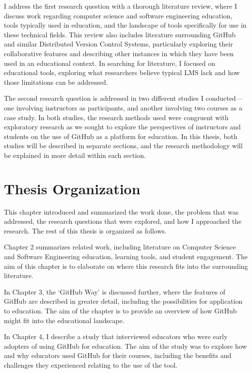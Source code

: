 I address the first research question with a thorough literature review, where I discuss work regarding computer science and software engineering education, tools typically used in education, and the landscape of tools specifically for use in these technical fields. This review also includes literature surrounding GitHub and similar Distributed Version Control Systems, particularly exploring their collaborative features and describing other instances in which they have been used in an educational context. In searching for literature, I focused on educational tools, exploring what researchers believe typical LMS lack and how those limitations can be addressed.

The second research question is addressed in two different studies I conducted---one involving instructors as participants, and another involving two courses as a case study. In both studies, the research methods used were congruent with exploratory research as we sought to explore the perspectives of instructors and students on the use of GitHub as a platform for education. In this thesis, both studies will be described in separate sections, and the research methodology will be explained in more detail within each section.

\section{Thesis Organization}
This chapter introduced and summarized the work done, the problem that was addressed, the research questions that were explored, and how I approached the research. The rest of this thesis is organized as follows.

Chapter 2 summarizes related work, including literature on Computer Science and Software Engineering education, learning tools, and student engagement. The aim of this chapter is to elaborate on where this research fits into the surrounding literature.

In Chapter 3, the `GitHub Way' is discussed further, where the features of GitHub are described in greater detail, including the possibilities for application to education. The aim of the chapter is to provide an overview of how GitHub might fit into the educational landscape.

In Chapter 4, I describe a study that interviewed educators who were early adopters of using GitHub for education. The aim of the study was to explore how and why educators used GitHub for their courses, including the benefits and challenges they experienced relating to the use of the tool.

